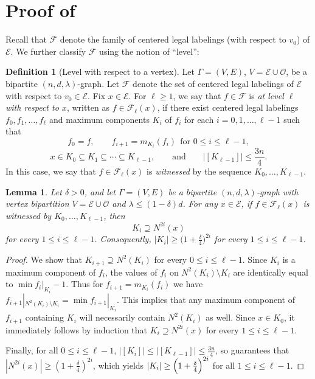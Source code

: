 \documentclass{amsart}
\newtheorem{lem}[thm]{Lemma}
\theoremstyle{definition}
\newtheorem{mydef}[thm]{Definition}
\newcommand{\cO}{\mathcal{O} }
\newcommand{\cE}{\mathcal{E} }
\newcommand{\0}[0]{\emptyset}
\begin{document}
\section{Proof of }\label{sec:proof-spectral}

Recall that $\mathcal{F}$ denote the family of centered legal labelings (with respect to $v_0$) of $\cE$. We further classify $\mathcal{F}$ using the notion of ``level'':

\begin{mydef}[Level with respect to a vertex]\label{def:level}
Let $\Gamma=(V, E)$, $V=\cE\cup \cO$, be a bipartite $(n,d,\lambda)$-graph. Let $\mathcal{F}$ denote the set of centered legal labelings of $\cE$ with respect to $v_0 \in \cE$. Fix $x \in \cE$. For $\ell\ge 1$, we say that $f\in \mathcal{F}$ is \emph{at level $\ell$ with respect to $x$}, written as $f\in \mathcal{F}_\ell(x)$, if there exist centered legal labelings $f_0, f_1, \dots, f_\ell$ and maximum components $K_i$ of $f_i$ for each $i=0, 1, \ldots, \ell-1$ such that
\[
f_0=f, \qquad
f_{i+1}=m_{K_i}(f_i)\ \ \text{for } 0\le i\le \ell-1,
\]
\[
x\in K_0\subseteq K_1\subseteq\cdots\subseteq K_{\ell-1},
\qquad \text{and} \qquad
|[K_{\ell-1}]|\le \frac{3n}{4}.
\]
In this case, we say that $f\in\mathcal{F}_\ell(x)$ is \textit{witnessed} by the sequence $K_0,\dots,K_{\ell-1}$.
\end{mydef}

\begin{lem}\label{lem:level-size-growth}
Let $\delta>0$, and let $\Gamma=(V, E)$ be a bipartite $(n,d,\lambda)$-graph with vertex bipartition $V=\cE\cup \cO$ and $\lambda\le (1-\delta)d$. For any $x \in \cE$, if $f\in \mathcal{F}_\ell(x)$ is witnessed by $K_0,\dots,K_{\ell-1}$, then 
\[
K_i\supseteq N^{2i}(x)
\]
for every $1\le i\leq \ell-1$. Consequently,  $|K_i|\ge \bigl(1+\frac{\delta}{4}\bigr)^{2i}$ for every $1\le i\leq \ell-1$.
\end{lem}


\begin{proof}
We show that $K_{i+1}\supseteq N^2(K_i)$ for every $0\leq i\leq \ell-1$. Since $K_i$ is a maximum component of $f_i$, the values of $f_i$ on $N^2(K_i)\setminus K_i$ are identically equal to $\min f_i|_{K_i}-1$. Thus for $f_{i+1}=m_{K_i}(f_i)$ we have $f_{i+1}|_{N^2(K_i)\setminus K_i}=\min f_{i+1}|_{K_i}$. This implies that any maximum component of $f_{i+1}$ containing $K_i$ will necessarily contain $N^2(K_i)$ as well. Since $x\in K_0$, it immediately follows by induction that $K_i\supseteq N^{2i}(x)$ for every $1\leq i\leq \ell-1$.

Finally, for all $0 \le i \le \ell-1$, $|[K_{i}]| \le |[K_{\ell-1}]|\leq \frac{3n}{4}$, so  guarantees that $|N^{2i}(x)| \ge (1+\frac{\delta}{4})^{2i}$, which yields $|K_i|\ge \Bigl(1+\frac{\delta}{4}\Bigr)^{2i}$ for all $1 \le i \le \ell-1$.
\end{proof}
\end{document}
